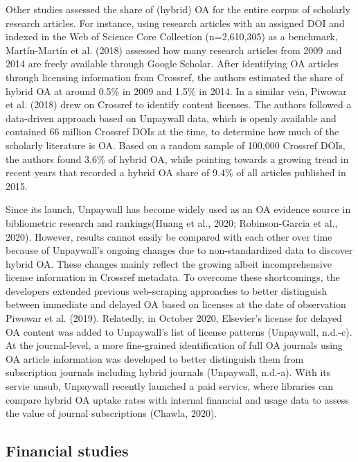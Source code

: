 \documentclass[a4paper,man,floatsintext,longtable,noextraspace,12pt]{apa6}
\begin{document}
Other studies assessed the share of (hybrid) OA for the entire corpus of
scholarly research articles. For instance, using research articles with
an assigned DOI and indexed in the Web of Science Core Collection
(n=2,610,305) as a benchmark, Martín-Martín et al. (2018) assessed how
many research articles from 2009 and 2014 are freely available through
Google Scholar. After identifying OA articles through licensing
information from Crossref, the authors estimated the share of hybrid OA
at around 0.5\% in 2009 and 1.5\% in 2014. In a similar vein, Piwowar et
al. (2018) drew on Crossref to identify content licenses. The authors
followed a data-driven approach based on Unpaywall data, which is openly
available and contained 66 million Crossref DOIs at the time, to
determine how much of the scholarly literature is OA. Based on a random
sample of 100,000 Crossref DOIs, the authors found 3.6\% of hybrid OA,
while pointing towards a growing trend in recent years that recorded a
hybrid OA share of 9.4\% of all articles published in 2015.

Since its launch, Unpaywall has become widely used as an OA evidence
source in bibliometric research and rankings(Huang et al., 2020;
Robinson-Garcia et al., 2020). However, results cannot easily be
compared with each other over time because of Unpaywall's ongoing
changes due to non-standardized data to discover hybrid OA. These
changes mainly reflect the growing albeit incomprehensive license
information in Crossref metadata. To overcome these shortcomings, the
developers extended previous web-scraping approaches to better
distinguish between immediate and delayed OA based on licenses at the
date of observation Piwowar et al. (2019). Relatedly, in October 2020,
Elsevier's license for delayed OA content was added to Unpaywall's list
of license patterns (Unpaywall, n.d.-c). At the journal-level, a more
fine-grained identification of full OA journals using OA article
information was developed to better distinguish them from subscription
journals including hybrid journals (Unpaywall, n.d.-a). With its servie
unsub, Unpaywall recently launched a paid service, where libraries can
compare hybrid OA uptake rates with internal financial and usage data to
assess the value of journal subscriptions (Chawla, 2020).

\hypertarget{financial-studies}{%
\subsection{Financial studies}\label{financial-studies}}
\end{document}
